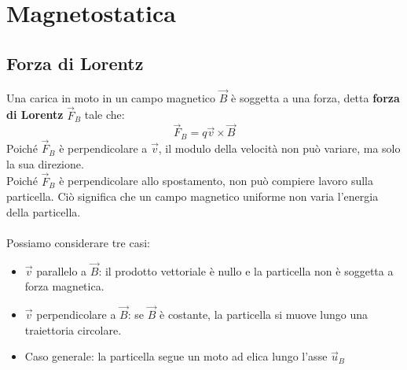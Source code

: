 \chapter{Magnetostatica}



\section{Forza di Lorentz}
Una carica in moto in un campo magnetico $\vec{B}$ è soggetta a una forza, detta \textbf{forza di Lorentz} $\vec{F}_B$ tale che:
\begin{displaymath}
	\vec{F}_B = q \vec{v} \times \vec{B}
\end{displaymath}
Poiché $\vec{F}_B$ è perpendicolare a $\vec{v}$, il modulo della velocità non può variare, ma solo la sua direzione.\\
Poiché $\vec{F}_B$ è perpendicolare allo spostamento, non può compiere lavoro sulla particella. Ciò significa che un campo magnetico uniforme non varia l'energia della particella.\\\\
Possiamo considerare tre casi:
\begin{itemize}
	\item{$\vec{v}$ parallelo a $\vec{B}$: il prodotto vettoriale è nullo e la particella non è soggetta a forza magnetica.}
    \item{$\vec{v}$ perpendicolare a $\vec{B}$: se $\vec{B}$ è costante, la particella si muove lungo una traiettoria circolare.}
    \item{Caso generale: la particella segue un moto ad elica lungo l'asse $\vec{u}_B$}
\end{itemize}

